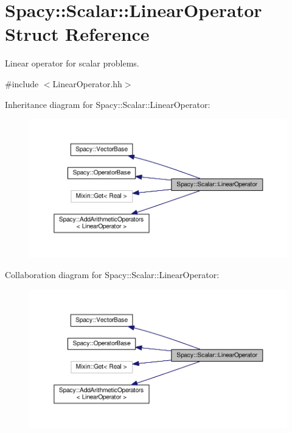 \hypertarget{structSpacy_1_1Scalar_1_1LinearOperator}{\section{Spacy\-:\-:Scalar\-:\-:Linear\-Operator Struct Reference}
\label{structSpacy_1_1Scalar_1_1LinearOperator}
}


Linear operator for scalar problems.  




{\ttfamily \#include $<$Linear\-Operator.\-hh$>$}



Inheritance diagram for Spacy\-:\-:Scalar\-:\-:Linear\-Operator\-:
\nopagebreak
\begin{figure}[H]
\begin{center}
\leavevmode
\includegraphics[width=350pt]{structSpacy_1_1Scalar_1_1LinearOperator__inherit__graph}
\end{center}
\end{figure}


Collaboration diagram for Spacy\-:\-:Scalar\-:\-:Linear\-Operator\-:
\nopagebreak
\begin{figure}[H]
\begin{center}
\leavevmode
\includegraphics[width=350pt]{structSpacy_1_1Scalar_1_1LinearOperator__coll__graph}
\end{center}
\end{figure}
